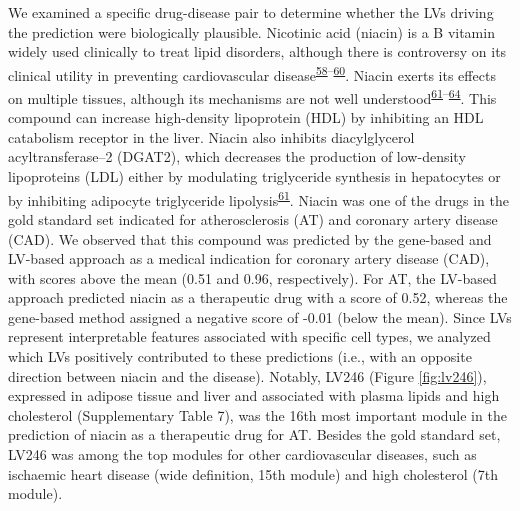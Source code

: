 \documentclass[
  a4paper,
]{article}
\begin{document}
We examined a specific drug-disease pair to determine whether the LVs driving the prediction were biologically plausible.
Nicotinic acid (niacin) is a B vitamin widely used clinically to treat lipid disorders, although there is controversy on its clinical utility in preventing cardiovascular disease\textsuperscript{\protect\hyperlink{ref-bRPc66OD}{58}--\protect\hyperlink{ref-ZGvG75Bj}{60}}.
Niacin exerts its effects on multiple tissues, although its mechanisms are not well understood\textsuperscript{\protect\hyperlink{ref-LVihFr3g}{61}--\protect\hyperlink{ref-13meq3Hgt}{64}}.
This compound can increase high-density lipoprotein (HDL) by inhibiting an HDL catabolism receptor in the liver.
Niacin also inhibits diacylglycerol acyltransferase--2 (DGAT2), which decreases the production of low-density lipoproteins (LDL) either by modulating triglyceride synthesis in hepatocytes or by inhibiting adipocyte triglyceride lipolysis\textsuperscript{\protect\hyperlink{ref-LVihFr3g}{61}}.
Niacin was one of the drugs in the gold standard set indicated for atherosclerosis (AT) and coronary artery disease (CAD).
We observed that this compound was predicted by the gene-based and LV-based approach as a medical indication for coronary artery disease (CAD), with scores above the mean (0.51 and 0.96, respectively).
For AT, the LV-based approach predicted niacin as a therapeutic drug with a score of 0.52, whereas the gene-based method assigned a negative score of -0.01 (below the mean).
Since LVs represent interpretable features associated with specific cell types, we analyzed which LVs positively contributed to these predictions (i.e., with an opposite direction between niacin and the disease).
Notably, LV246 (Figure \ref{fig:lv246}), expressed in adipose tissue and liver and associated with plasma lipids and high cholesterol (Supplementary Table 7), was the 16th most important module in the prediction of niacin as a therapeutic drug for AT.
Besides the gold standard set, LV246 was among the top modules for other cardiovascular diseases, such as ischaemic heart disease (wide definition, 15th module) and high cholesterol (7th module).
\end{document}
